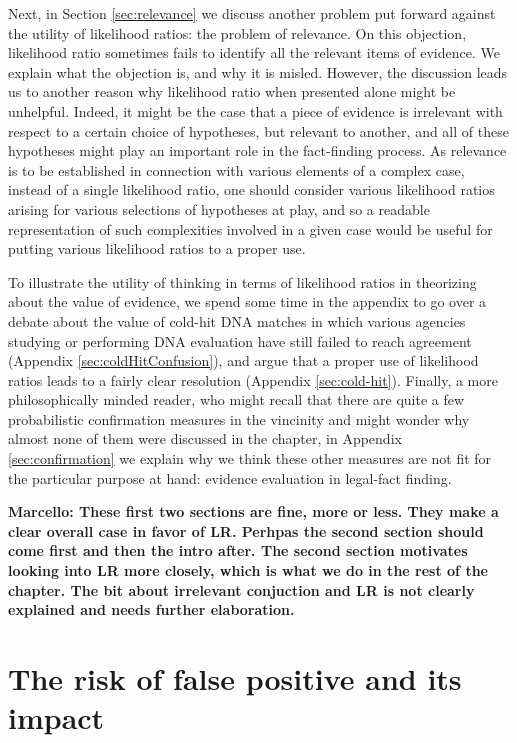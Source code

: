 \documentclass[
  10pt,
  dvipsnames,enabledeprecatedfontcommands]{scrartcl}
\newcommand{\mar}[1]{\todo[color=blue!40]{#1}}
\begin{document}
Next, in Section \ref{sec:relevance} we discuss another problem put
forward against the utility of likelihood ratios: the problem of
relevance. On this objection, likelihood ratio sometimes fails to
identify all the relevant items of evidence. We explain what the
objection is, and why it is misled. However, the discussion leads us to
another reason why likelihood ratio when presented alone might be
unhelpful. Indeed, it might be the case that a piece of evidence is
irrelevant with respect to a certain choice of hypotheses, but relevant
to another, and all of these hypotheses might play an important role in
the fact-finding process. As relevance is to be established in
connection with various elements of a complex case, instead of a single
likelihood ratio, one should consider various likelihood ratios arising
for various selections of hypotheses at play, and so a readable
representation of such complexities involved in a given case would be
useful for putting various likelihood ratios to a proper use.

To illustrate the utility of thinking in terms of likelihood ratios in
theorizing about the value of evidence, we spend some time in the
appendix to go over a debate about the value of cold-hit DNA matches in
which various agencies studying or performing DNA evaluation have still
failed to reach agreement (Appendix \ref{sec:coldHitConfusion}), and
argue that a proper use of likelihood ratios leads to a fairly clear
resolution (Appendix \ref{sec:cold-hit}). Finally, a more
philosophically minded reader, who might recall that there are quite a
few probabilistic confirmation measures in the vincinity and might
wonder why almost none of them were discussed in the chapter, in
Appendix \ref{sec:confirmation} we explain why we think these other
measures are not fit for the particular purpose at hand: evidence
evaluation in legal-fact finding.

\vspace{3mm}

\textbf{Marcello: These first two sections are fine, more or less. They make a clear overall case in favor of LR. Perhpas the second section should come first and then the intro after. The second section motivates looking into LR more closely, which is what we do in the rest of the chapter. The bit about irrelevant conjuction and LR is not clearly explained and needs further elaboration. }

\mar{Revised, check if you're happy with this now.}

\hypertarget{the-risk-of-false-positive-and-its-impact}{%
\section{\texorpdfstring{The risk of false positive and its impact
\label{sec:fp}}{The risk of false positive and its impact }}\label{the-risk-of-false-positive-and-its-impact}}
\end{document}
